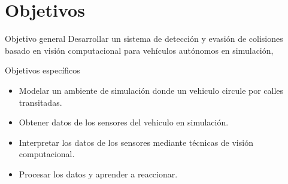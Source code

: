 \documentclass[8pt]{beamer}
\begin{document}
    \section{Objetivos}
    \begin{frame}{Objetivo general}
        Desarrollar un sistema de detección y evasión de colisiones basado en visión computacional para vehículos autónomos en simulación,
    \end{frame}
    \begin{frame}{Objetivos específicos}
        \begin{itemize}
            \item Modelar un ambiente de simulación donde un vehiculo circule por calles transitadas.
            \item Obtener datos de los sensores del vehiculo en simulación.
            \item Interpretar los datos de los sensores mediante técnicas de visión computacional.
            \item Procesar los datos y aprender a reaccionar.
        \end{itemize}
    \end{frame}
\end{document}
